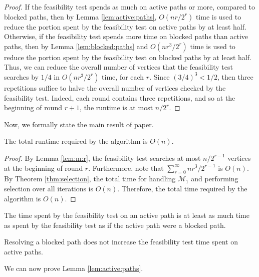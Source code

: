 \documentclass[12pt]{article}
\begin{document}
\begin{spacing}{3}
\begin{proof}
If the feasibility test spends as much on active paths or more, compared to blocked paths, then by Lemma \ref{lem:active:paths}, $O(nr/2^r)$ time is used to reduce the portion spent by the feasibility test on active paths by at least half.
\vskip 0.2in\noindent
Otherwise, if the feasibility test spends more time on blocked paths than active paths, then by Lemma \ref{lem:blocked:paths} and $O(nr^3/2^r)$ time is used to reduce the portion spent by the feasibility test on blocked paths by at least half. Thus, we can reduce the overall number of vertices that the feasibility test searches by $1/4$ in $O(nr^3/2^r)$ time, for each $r$. Since $(3/4)^3<1/2$, then three repetitions suffice to halve the overall number of vertices checked by the feasibility test. Indeed, each round contains three repetitions, and so at the beginning of round $r+1$, the runtime is at most $n/2^r$.
\end{proof}

\noindent
Now, we formally state the main result of paper.

\begin{theorem}
The total runtime required by the algorithm is $O(n)$.
\end{theorem}
\begin{proof}
By Lemma \ref{lem:m:r}, the feasibility test searches at most $n/2^{r-1}$ vertices at the beginning of round $r$. Furthermore, note that $\sum_{r=0}^\infty nr^3/2^{r-1}$ is $O(n)$. By Theorem \ref{thm:selection}, the total time for handling $\mathcal{M}_1$ and performing selection over all iterations is $O(n)$. Therefore, the total time required by the algorithm is $O(n)$.
\end{proof}

\begin{observation}
The time spent by the feasibility test on an active path is at least as much time as spent by the feasibility test as if the active path were a blocked path.
\end{observation}

\begin{observation}
Resolving a blocked path does not increase the feasibility test time spent on active paths.
\end{observation}

\noindent
We can now prove Lemma \ref{lem:active:paths}.


\end{spacing}
\end{document}
